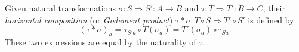 Given natural transformations $\sigma: S \Rightarrow S': A \to B$ and $\tau: T \Rightarrow T': B \to C$, their \emph{horizontal composition} (or \emph{Godement product}) $\tau * \sigma: T \circ S \Rightarrow T' \circ S'$ is defined by
$$(\tau * \sigma)_a = \tau_{S'a} \circ T(\sigma_a) = T'(\sigma_a) \circ \tau_{Sa}.$$
These two expressions are equal by the naturality of $\tau$.
